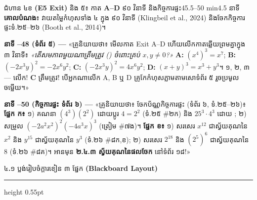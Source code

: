 \documentclass[a4paper,12pt]{article}
\newcommand{\en}[1]{{\TimesEn #1}}
\newcommand{\enbf}[1]{{\TimesEn\textbf{#1}}}
\newcommand{\cnum}[1]{{\TimesEn\fontsize{10.5pt}{12pt}\selectfont\ding{\numexpr181+#1\relax}}}
\newcommand{\subsectitle}[1]{{\muol\fontsize{11.5pt}{18.5pt}\selectfont #1}}
\newcommand{\teachersays}[1]{{\muol\fontsize{10.8pt}{17pt}\selectfont «គ្រូនិយាយថា៖} #1»}
\newcommand{\subsec}[1]{%
  \Needspace{1.7cm}%
  \vspace{3pt}%
  \subsectitle{#1}\par%
  \vspace{-2pt}%
  {\color{black}\hrule height 0.55pt}%
  \vspace{3pt}%
}
\begin{document}
\Needspace{2.0cm}
\begin{phasebox}{ជំហាន ៤ខ \enbf{(E5 Exit)} និង ៥៖ កាត \enbf{A--D} ៩០ វិនាទី និងកិច្ចការផ្ទះ}{45.5--50 min}{4.5 នាទី}
\textbf{គោលបំណង}៖ វាយតម្លៃកំហុសទាំង ៤ ក្នុង ៩០ វិនាទី (\en{Klingbeil et al., 2024}) និងចែកកិច្ចការផ្ទះទំ.២៥--២៦ (\en{Booth et al., 2014})។
\end{phasebox}
\begin{scriptbox}
  \textbf{នាទី \en{45.5--48} (ទំព័រ ៥) — }\teachersays{មើលកាត \en{Exit A--D} ហើយលើកកាតឆ្លើយព្រមគ្នាក្នុង ៣ វិនាទី៖ \textit{«តើសមភាពមួយណាត្រឹមត្រូវ (\ding{51}) ចំពោះគ្រប់ $x, y \neq 0$?»} \textbf{A:} $(x^4)^3=x^7$; \textbf{B:} $(-2x^3y)^2=-2x^6y^2$; \textbf{C:} $(-2x^3y)^2=4x^6y^2$; \textbf{D:} $(x+y)^3=x^3+y^3$។ ១, ២, ៣ — លើក! \textbf{C} ត្រឹមត្រូវ! បើអ្នកណាលើក A, B ឬ D គ្រូកែកំហុសភ្លាមតាមសោទំព័រ ៥ រួចប្រមូលចម្លើយ។}\par\vspace{3pt}
  \textbf{នាទី \en{48--50} (កិច្ចការផ្ទះ ទំព័រ ៦) — }\teachersays{ចែកប័ណ្ណកិច្ចការផ្ទះ (ទំព័រ ៦, ទំ.២៥--២៦)៖ \textbf{ផ្នែក ក៖} ១) គណនា $(4^3)(2^2)$ ដោយប្ដូរ $4=2^2$ (ទំ.២៥ \#២ក) និង $25^3\cdot 4^3$ ដោយ \cnum{3}; ២) សម្រួល $(-2a^2x^2)^2(-4a^3x)^3$ (ត្រៀម \#៧ង)។ \textbf{ផ្នែក ខ៖} ១) សរសេរ $x^{12}$ ជាស្វ័យគុណនៃ $x^2$ និង $y^{15}$ ជាស្វ័យគុណនៃ $y^3$ (ទំ.២៦ \#៨ក,ខ); ២) សរសេរ $2^{18}$ និង $(2^5)^6$ ជាស្វ័យគុណនៃ $8$ (ទំ.២៦ \#៨គ)។ អានមុន \textbf{២.៤.៣ ស្វ័យគុណនៃផលចែក} នៅទំព័រ ១៨!}
\end{scriptbox}

\subsec{៤\enbf{.}១ ប្លង់រៀបចំក្ដារខៀន ៣ ផ្នែក \enbf{(Blackboard Layout)}}
\end{document}
